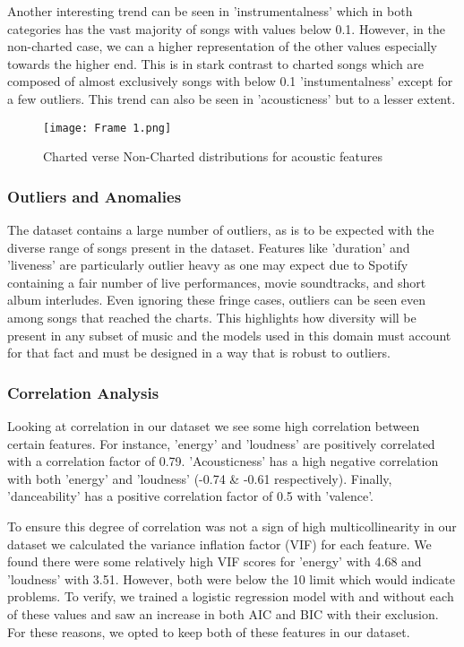 \documentclass[conference]{IEEEtran}
\begin{document}
Another interesting trend can be seen in 'instrumentalness' which in both categories has the vast majority of songs with values below 0.1. However, in the non-charted case, we can a higher representation of the other values especially towards the higher end. This is in stark contrast to charted songs which are composed of almost exclusively songs with below 0.1 'instumentalness' except for a few outliers. This trend can also be seen in 'acousticness' but to a lesser extent.

\begin{figure}[htbp]
\centerline{\texttt{[image: Frame 1.png]}}
\caption{Charted verse Non-Charted distributions for acoustic features}
\label{fig1}
\end{figure}

\subsubsection{Outliers and Anomalies}
The dataset contains a large number of outliers, as is to be expected with the diverse range of songs present in the dataset.
Features like 'duration' and 'liveness' are particularly outlier heavy as one may expect due to Spotify containing a fair number of live performances, movie soundtracks, and short album interludes. Even ignoring these fringe cases, outliers can be seen even among songs that reached the charts. This highlights how diversity will be present in any subset of music and the models used in this domain must account for that fact and must be designed in a way that is robust to outliers.
\subsubsection{Correlation Analysis}
Looking at correlation in our dataset we see some high correlation between certain features. For instance, 'energy' and 'loudness' are positively correlated with a correlation factor of 0.79. 'Acousticness' has a high negative correlation with both 'energy' and 'loudness' (-0.74 \& -0.61 respectively). Finally, 'danceability' has a positive correlation factor of 0.5 with 'valence'.

To ensure this degree of correlation was not a sign of high multicollinearity in our dataset we calculated the variance inflation factor (VIF) for each feature. We found there were some relatively high VIF scores for 'energy' with 4.68 and 'loudness' with 3.51. However, both were below the 10 limit which would indicate problems. To verify, we trained a logistic regression model with and without each of these values and saw an increase in both AIC and BIC with their exclusion. For these reasons, we opted to keep both of these features in our dataset. 
\end{document}
